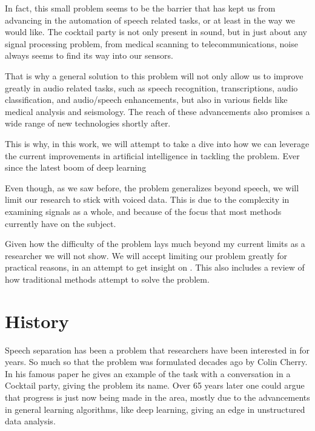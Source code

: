 \documentclass{book}
\begin{document}
In fact, this small problem seems to be the barrier that has kept us from advancing in the automation of speech related tasks, or at least in the way we would like.
The cocktail party is not only present in sound, but in just about any signal processing problem, from medical scanning to telecommunications\cite{CocktailPartyProblemRevisit}, noise always seems to find its way into our sensors.
\par
That is why a general solution to this problem will not only allow us to improve greatly in audio related tasks, such as speech recognition, transcriptions, audio classification, and audio/speech enhancements, but also in various fields like medical analysis and seismology.
The reach of these advancements also promises a wide range of new technologies shortly after.
\par
This is why, in this work, we will attempt to take a dive into how we can leverage the current improvements in artificial intelligence in tackling the problem.
Ever since the latest boom of deep learning \cite{DeepLearning}
\par
Even though, as we saw before, the problem generalizes beyond speech, we will limit our research to stick with voiced data.
This is due to the complexity in examining signals as a whole, and because of the focus that most methods currently have on the subject.
\par
Given how the difficulty of the problem lays much beyond my current limits as a researcher we will not show.
We will accept limiting our problem greatly for practical reasons, in an attempt to get insight on .
This also includes a review of how traditional methods attempt to solve the problem.
\section{History}
\qquad Speech separation has been a problem that researchers have been interested in for years.
So much so that the problem was formulated decades ago by Colin Cherry\cite{Cherry}.
In his famous paper he gives an example of the task with a conversation in a Cocktail party, giving the problem its name.
Over 65 years later one could argue that progress is just now being made in the area, mostly due to the advancements in general learning algorithms, like deep learning, giving an edge in unstructured data analysis.
\end{document}
